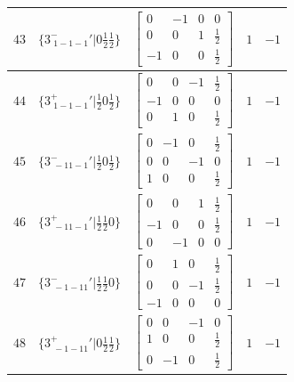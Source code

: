 \documentclass[fleqn,8pt]{jsarticle}
\begin{document}
\begin{longtable}{ccccc}
$ 43 $ & $ \{3^{-}_{\,\,1-1-1}{}'|0 \frac{1}{2} \frac{1}{2}\} $ & $ \begin{bmatrix} 0 & -1 & 0 & 0 \\ 0 & 0 & 1 & \frac{1}{2} \\ -1 & 0 & 0 & \frac{1}{2} \end{bmatrix} $ & $ 1 $ & $ -1 $ \\ \hline
$ 44 $ & $ \{3^{+}_{\,\,1-1-1}{}'|\frac{1}{2} 0 \frac{1}{2}\} $ & $ \begin{bmatrix} 0 & 0 & -1 & \frac{1}{2} \\ -1 & 0 & 0 & 0 \\ 0 & 1 & 0 & \frac{1}{2} \end{bmatrix} $ & $ 1 $ & $ -1 $ \\ \hline
$ 45 $ & $ \{3^{-}_{\,\,-11-1}{}'|\frac{1}{2} 0 \frac{1}{2}\} $ & $ \begin{bmatrix} 0 & -1 & 0 & \frac{1}{2} \\ 0 & 0 & -1 & 0 \\ 1 & 0 & 0 & \frac{1}{2} \end{bmatrix} $ & $ 1 $ & $ -1 $ \\ \hline
$ 46 $ & $ \{3^{+}_{\,\,-11-1}{}'|\frac{1}{2} \frac{1}{2} 0\} $ & $ \begin{bmatrix} 0 & 0 & 1 & \frac{1}{2} \\ -1 & 0 & 0 & \frac{1}{2} \\ 0 & -1 & 0 & 0 \end{bmatrix} $ & $ 1 $ & $ -1 $ \\ \hline
$ 47 $ & $ \{3^{-}_{\,\,-1-11}{}'|\frac{1}{2} \frac{1}{2} 0\} $ & $ \begin{bmatrix} 0 & 1 & 0 & \frac{1}{2} \\ 0 & 0 & -1 & \frac{1}{2} \\ -1 & 0 & 0 & 0 \end{bmatrix} $ & $ 1 $ & $ -1 $ \\ \hline
$ 48 $ & $ \{3^{+}_{\,\,-1-11}{}'|0 \frac{1}{2} \frac{1}{2}\} $ & $ \begin{bmatrix} 0 & 0 & -1 & 0 \\ 1 & 0 & 0 & \frac{1}{2} \\ 0 & -1 & 0 & \frac{1}{2} \end{bmatrix} $ & $ 1 $ & $ -1 $ \\
\end{longtable}
\end{document}

